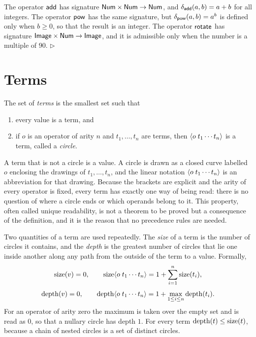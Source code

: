 \begin{example}
The operator $\mathsf{add}$ has signature $\mathsf{Num}\times\mathsf{Num}\to\mathsf{Num}$, and $\delta_{\mathsf{add}}(a,b) = a+b$ for all integers. The operator $\mathsf{pow}$ has the same signature, but $\delta_{\mathsf{pow}}(a,b) = a^{b}$ is defined only when $b \ge 0$, so that the result is an integer. The operator $\mathsf{rotate}$ has signature $\mathsf{Image}\times\mathsf{Num}\to\mathsf{Image}$, and it is admissible only when the number is a multiple of $90$. \hfill$\triangleright$
\end{example}

\section{Terms}

\begin{definition}[Terms]\label{def:terms}
The set of \emph{terms} is the smallest set such that
\begin{enumerate}[label=(\roman*)]
\item every value is a term, and
\item if $o$ is an operator of arity $n$ and $t_1,\dots,t_n$ are terms, then $\langle o\; t_1\cdots t_n\rangle$ is a term, called a \emph{circle}.
\end{enumerate}
\end{definition}

A term that is not a circle is a value. A circle is drawn as a closed curve labelled $o$ enclosing the drawings of $t_1,\dots,t_n$, and the linear notation $\langle o\; t_1\cdots t_n\rangle$ is an abbreviation for that drawing. Because the brackets are explicit and the arity of every operator is fixed, every term has exactly one way of being read: there is no question of where a circle ends or which operands belong to it. This property, often called unique readability, is not a theorem to be proved but a consequence of the definition, and it is the reason that no precedence rules are needed.

Two quantities of a term are used repeatedly. The \emph{size} of a term is the number of circles it contains, and the \emph{depth} is the greatest number of circles that lie one inside another along any path from the outside of the term to a value. Formally,
\[
\operatorname{size}(v) = 0,\qquad \operatorname{size}\langle o\; t_1\cdots t_n\rangle = 1 + \sum_{i=1}^{n}\operatorname{size}(t_i),
\]
\[
\operatorname{depth}(v) = 0,\qquad \operatorname{depth}\langle o\; t_1\cdots t_n\rangle = 1 + \max_{1\le i\le n}\operatorname{depth}(t_i).
\]
For an operator of arity zero the maximum is taken over the empty set and is read as $0$, so that a nullary circle has depth $1$. For every term $\operatorname{depth}(t)\le\operatorname{size}(t)$, because a chain of nested circles is a set of distinct circles.

